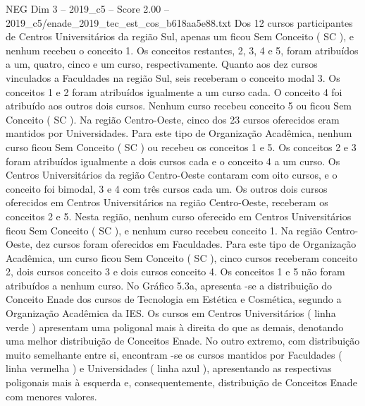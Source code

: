 \begin{textsample}{NEG Dim 3 – 2019\_c5 – Score 2.00 – 2019\_c5/enade\_2019\_tec\_est\_cos\_b618aa5e88.txt}
Dos 12 cursos participantes de Centros Universitários da região Sul, apenas um ficou Sem Conceito ( SC ), e nenhum recebeu o conceito 1.
Os conceitos restantes, 2, 3, 4 e 5, foram atribuídos a um, quatro, cinco e um curso, respectivamente.
Quanto aos dez cursos vinculados a Faculdades na região Sul, seis receberam o conceito modal 3.
Os conceitos 1 e 2 foram atribuídos igualmente a um curso cada.
O conceito 4 foi atribuído aos outros dois cursos.
Nenhum curso recebeu conceito 5 ou ficou Sem Conceito ( SC ).
Na região Centro-Oeste, cinco dos 23 cursos oferecidos eram mantidos por Universidades.
Para este tipo de Organização Acadêmica, nenhum curso ficou Sem Conceito ( SC ) ou recebeu os conceitos 1 e 5.
Os conceitos 2 e 3 foram atribuídos igualmente a dois cursos cada e o conceito 4 a um curso.
Os Centros Universitários da região Centro-Oeste contaram com oito cursos, e o conceito foi bimodal, 3 e 4 com três cursos cada um.
Os outros dois cursos oferecidos em Centros Universitários na região Centro-Oeste, receberam os conceitos 2 e 5.
Nesta região, nenhum curso oferecido em Centros Universitários ficou Sem Conceito ( SC ), e nenhum curso recebeu conceito 1.
Na região Centro-Oeste, dez cursos foram oferecidos em Faculdades.
Para este tipo de Organização Acadêmica, um curso ficou Sem Conceito ( SC ), cinco cursos receberam conceito 2, dois cursos conceito 3 e dois cursos conceito 4.
Os conceitos 1 e 5 não foram atribuídos a nenhum curso.
No Gráfico 5.3a, apresenta -se a distribuição do Conceito Enade dos cursos de Tecnologia em Estética e Cosmética, segundo a Organização Acadêmica da IES.
Os cursos em Centros Universitários ( linha verde ) apresentam uma poligonal mais à direita do que as demais, denotando uma melhor distribuição de Conceitos Enade.
No outro extremo, com distribuição muito semelhante entre si, encontram -se os cursos mantidos por Faculdades ( linha vermelha ) e Universidades ( linha azul ), apresentando as respectivas poligonais mais à esquerda e, consequentemente, distribuição de Conceitos Enade com menores valores.

\end{textsample}
